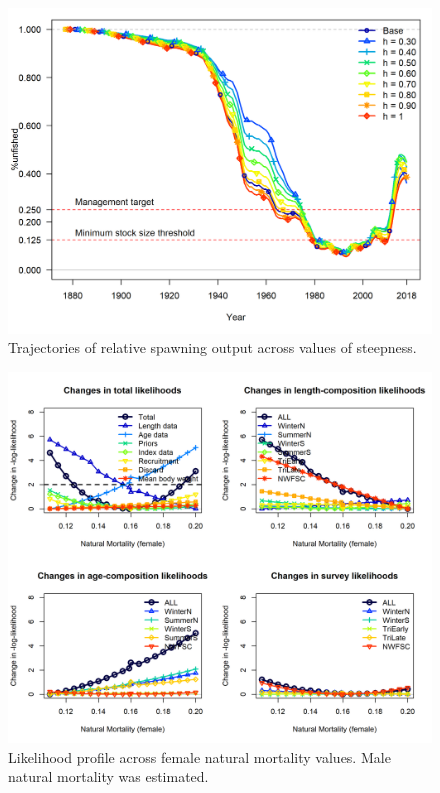 \documentclass[12pt,]{article}
\begin{document}
\FloatBarrier

\begin{figure}
\centering
\includegraphics{Figures/h_trajectories_depl.png}
\caption{Trajectories of relative spawning output across values of
steepness. \label{fig:h_depl_trajectory}}
\end{figure}

\FloatBarrier

\begin{figure}
\centering
\includegraphics{Figures/piner_panel_m.png}
\caption{Likelihood profile across female natural mortality values. Male
natural mortality was estimated. \label{fig:m_like}}
\end{figure}
\end{document}
